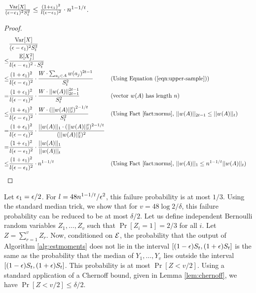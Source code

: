 
\begin{claim} $\frac{\mathrm{Var}[X]}{(\epsilon-\epsilon_1)^2 S_t^2}\leq \frac{(1+\epsilon_1)^2}{l(\epsilon-\epsilon_1)^2} \cdot n^{1-1/t}$. \end{claim}

\begin{proof}
\begin{align*}
& \frac{\mathrm{Var}[X]}{(\epsilon-\epsilon_1)^2 S_t^2} \\
\leq &\frac{\mathbb{E}[X_j^2]}{l(\epsilon-\epsilon_1)^2 \cdot S_t^2} \\
 \leq &\frac{(1+\epsilon_1)^2}{l(\epsilon-\epsilon_1)^2} \cdot \frac{W \cdot \sum_{a_j\in A} w(a_j)^{2t-1}}{S_t^2} && \text{(Using Equation (\ref{eqn:upper-sample}))}\\
 = & \frac{(1+\epsilon_1)^2}{l(\epsilon-\epsilon_1)^2} \cdot \frac{W \cdot ||w(A)||_{2t-1}^{2t-1}}{S_t^2} && \text{(vector $w(A)$ has length $n$)} \\
 \leq &\frac{(1+\epsilon_1)^2}{l(\epsilon-\epsilon_1)^2} \cdot \frac{W \cdot {(||w(A)||_t^t)}^{2-1/t}}{S_t^2} && \text{(Using Fact~\ref{fact:norms}, $||w(A)||_{2t-1}\leq ||w(A)||_t$)} \\
 = &\frac{(1+\epsilon_1)^2}{l(\epsilon-\epsilon_1)^2} \cdot \frac{||w(A)||_1 \cdot (||w(A)||_t^t)^{2-1/t}}{(||w(A)||_t^t)^2}\\
 = &\frac{(1+\epsilon_1)^2}{l(\epsilon-\epsilon_1)^2} \cdot \frac{||w(A)||_1}{||w(A)||_t}\\
 \leq &\frac{(1+\epsilon_1)^2}{l(\epsilon-\epsilon_1)^2} \cdot n^{1-1/t} && \text{(Using Fact~\ref{fact:norms}, $||w(A)||_1\leq n^{1-1/t} ||w(A)||_t$)}
\end{align*}
\end{proof}


Let $\epsilon_1=\epsilon/2$. For $l=48n^{1-1/t}/\epsilon^2$, this failure probability is at most $1/3$. Using the standard median trick, we show that for $v=48\log 2/\delta$, this failure probability can be reduced to be at most $\delta/2$. Let us define independent Bernoulli random variables $Z_1,\ldots,Z_v$ such that $\Pr[Z_i=1]=2/3$ for all $i$. Let $Z=\sum_{r=1}^v Z_r$. Now, conditioned on $\mathcal{E}$, the probability that the output of Algorithm \ref{alg:estmoments} does not lie in the interval $[(1-\epsilon)S_t,(1+\epsilon)S_t]$ is the same as the probability that the median of $Y_1,\ldots,Y_v$ lies outside the interval $[(1-\epsilon)S_t,(1+\epsilon)S_t]$. This probability is at most $\Pr[Z<v/2]$. Using a standard application of a Chernoff bound, given in Lemma \ref{lem:chernoff}, we have $\Pr[Z<v/2]\leq \delta/2$.

